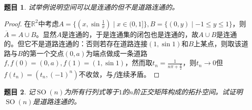 \documentclass[UTF-8,11pt,fancyhdr,hyperref,titlepage]{ctexart}
\theoremstyle{question}
\newtheorem{timu}{题目}
\theoremstyle{theorem}
\theoremstyle{definition}
\theoremstyle{remark}
\def\RR{{\mathbb R}}
\DeclareMathOperator{\SO}{SO}
\begin{document}
\begin{timu}\label{1}
  试举例说明空间可以是连通的但不是道路连通的。
\end{timu}
\begin{proof}
  在$\RR^2$中考虑$A=\{(x,\sin\frac{1}{x})\mid x\in(0,1]\},B=\{(0,y)\mid -1\leqslant y\leqslant 1\}$，则$\overline{A}=A\cup B$。显然$A$是连通的，于是连通集的闭包也是连通的，故$A\cup B$是连通的。但它不是道路连通的：否则若存在道路连接$(1,\sin1)$和$B$上某点，则取该道路与$B$的第一个交点$(0,a)$为端点做成一条道路$f, f(0)=(0,a), f(1)=(1,\sin1)$，然而取$t_n=\frac{1}{n\pi+\frac{\pi}{2}}$，则$t_n\to0$但$f(t_n)=(t_n,(-1)^n)$不收敛，与$f$连续矛盾。
\end{proof}

\begin{timu}\label{2}
  记$\SO(n)$为所有行列式等于$1$的$n$阶正交矩阵构成的拓扑空间。试证明$\SO(n)$是道路连通的。
\end{timu}
\end{document}

